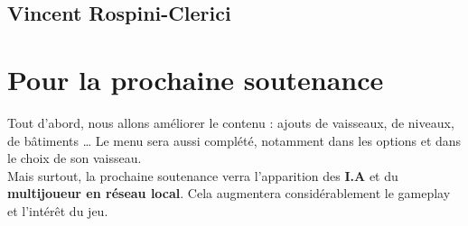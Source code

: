 \documentclass[10pt, titlepage]{report}
\begin{document}
\section{Vincent Rospini-Clerici}

\chapter{Pour la prochaine soutenance}

Tout d'abord, nous allons améliorer le contenu : ajouts de vaisseaux, de niveaux, de bâtiments \dots
Le menu sera aussi complété, notamment dans les options et dans le choix de son vaisseau.\\

Mais surtout, la prochaine soutenance verra l'apparition des \textbf{I.A} et du \textbf{multijoueur en réseau local}. Cela augmentera considérablement le gameplay et l'intérêt du jeu.
\end{document}
